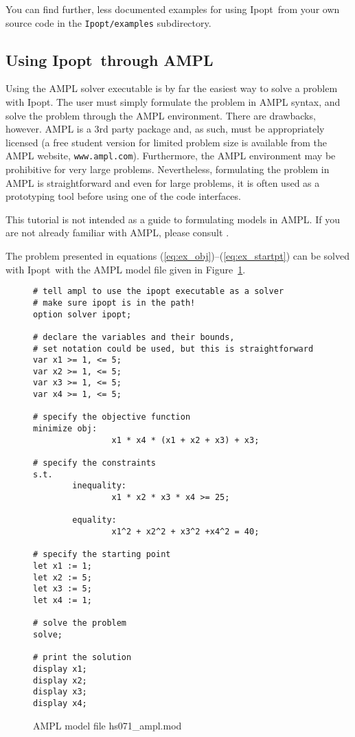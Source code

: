 \documentclass[10pt]{article}
\newcommand{\Ipopt}{{\sc Ipopt}}
\begin{document}
You can find further, less documented examples for using \Ipopt\ from
your own source code in the {\tt Ipopt/examples} subdirectory.

\subsection{Using \Ipopt\ through AMPL}
Using the AMPL solver executable is by far the easiest way to
solve a problem with \Ipopt. The user must simply formulate the problem
in AMPL syntax, and solve the problem through the AMPL environment.
There are drawbacks, however. AMPL is a 3rd party package and, as
such, must be appropriately licensed (a free student version for
limited problem size is available from the AMPL website,
\texttt{www.ampl.com}). Furthermore, the AMPL environment may be prohibitive
for very large problems. Nevertheless, formulating the problem in AMPL
is straightforward and even for large problems, it is often used as a
prototyping tool before using one of the code interfaces.

This tutorial is not intended as a guide to formulating models in
AMPL. If you are not already familiar with AMPL, please consult
\cite{FouGayKer:AMPLbook}.

The problem presented in equations
(\ref{eq:ex_obj})--(\ref{eq:ex_startpt}) can be solved with \Ipopt\ with
the AMPL model file given in Figure~\ref{fig:HS71}.

\begin{figure}
  \centering
\begin{footnotesize}
\begin{verbatim}
# tell ampl to use the ipopt executable as a solver
# make sure ipopt is in the path!
option solver ipopt;

# declare the variables and their bounds, 
# set notation could be used, but this is straightforward
var x1 >= 1, <= 5; 
var x2 >= 1, <= 5; 
var x3 >= 1, <= 5; 
var x4 >= 1, <= 5;

# specify the objective function
minimize obj:
                x1 * x4 * (x1 + x2 + x3) + x3;
        
# specify the constraints
s.t.
        inequality:
                x1 * x2 * x3 * x4 >= 25;
                
        equality:
                x1^2 + x2^2 + x3^2 +x4^2 = 40;

# specify the starting point            
let x1 := 1;
let x2 := 5;
let x3 := 5;
let x4 := 1;

# solve the problem
solve;

# print the solution
display x1;
display x2;
display x3;
display x4;
\end{verbatim}
\end{footnotesize}
  
  \caption{AMPL model file hs071\_ampl.mod}
  \label{fig:HS71}
\end{figure}
\end{document}
